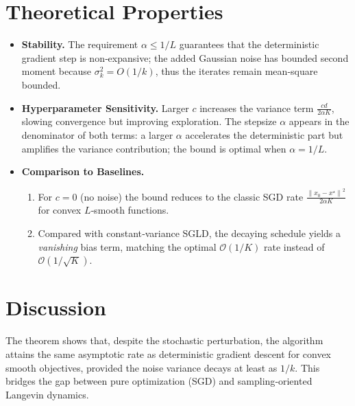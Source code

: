 \documentclass{article}
\newcommand{\norm}[1]{\left\lVert #1\right\rVert}
\begin{document}
\section*{Theoretical Properties}
\begin{itemize}
\item \textbf{Stability.} The requirement $\alpha\le 1/L$ guarantees that the deterministic gradient step is non‑expansive; the added Gaussian noise has bounded second moment because $\sigma_k^2=O(1/k)$, thus the iterates remain mean‑square bounded.
\item \textbf{Hyperparameter Sensitivity.} Larger $c$ increases the variance term $\frac{cd}{2\alpha K}$, slowing convergence but improving exploration. The stepsize $\alpha$ appears in the denominator of both terms: a larger $\alpha$ accelerates the deterministic part but amplifies the variance contribution; the bound is optimal when $\alpha=1/L$.
\item \textbf{Comparison to Baselines.} 
    \begin{enumerate}
        \item For $c=0$ (no noise) the bound reduces to the classic SGD rate $\frac{\norm{x_0-x^\star}^2}{2\alpha K}$ for convex $L$‑smooth functions.
        \item Compared with constant‑variance SGLD, the decaying schedule yields a \emph{vanishing} bias term, matching the optimal $\mathcal{O}(1/K)$ rate instead of $\mathcal{O}(1/\sqrt{K})$.
    \end{enumerate}
\end{itemize}

\section*{Discussion}
The theorem shows that, despite the stochastic perturbation, the algorithm attains the same asymptotic rate as deterministic gradient descent for convex smooth objectives, provided the noise variance decays at least as $1/k$. This bridges the gap between pure optimization (SGD) and sampling‑oriented Langevin dynamics.

\newpage
\end{document}
